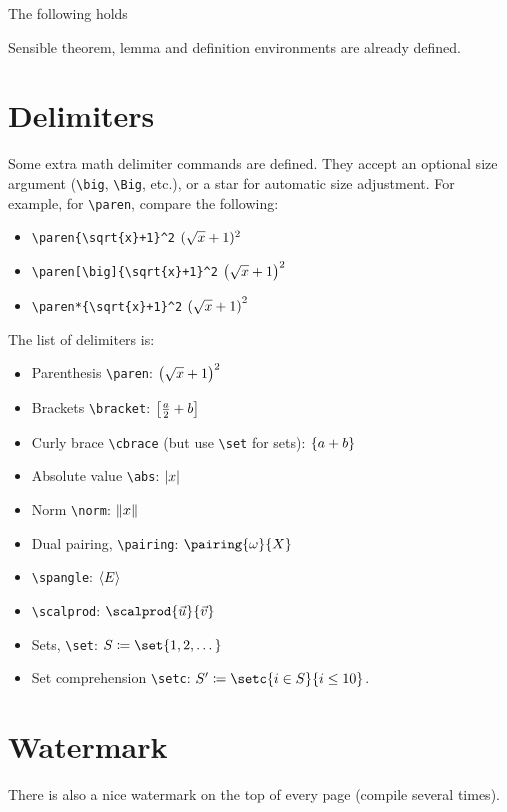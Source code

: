 \documentclass{scrartcl}
\begin{document}
The following holds
\begin{theorem}
Sensible theorem, lemma and definition environments are already defined.
\end{theorem}

\section{Delimiters}

Some extra math delimiter commands are defined.
They accept an optional size argument (\verb|\big|, \verb|\Big|, etc.), or a star for automatic size adjustment.
For example, for \verb|\paren|, compare the following:
\begin{itemize}
\item \verb|\paren{\sqrt{x}+1}^2| \(\paren{\sqrt{x}+1}^2\)
\item \verb|\paren[\big]{\sqrt{x}+1}^2| \(\paren[\big]{\sqrt{x}+1}^2\)
\item \verb|\paren*{\sqrt{x}+1}^2| \(\paren*{\sqrt{x}+1}^2\)
\end{itemize}

The list of delimiters is:

\begin{itemize}
\item Parenthesis \verb|\paren|: \(\paren[\big]{\sqrt{x} + 1}^2\)
  \item Brackets \verb|\bracket|: \(\bracket[\big]{\frac{a}{2}+b}\)
\item Curly brace \verb|\cbrace| (but use \verb|\set| for sets): \(\cbrace{a+b}\)
\item Absolute value \verb|\abs|: \(\abs{x}\)
\item Norm \verb|\norm|: \(\norm{x}\)
\item Dual pairing, \verb|\pairing|: \(\pairing{\omega}{X}\)
  \item \verb|\spangle|: \(\spangle{E}\)
\item \verb|\scalprod|: \(\scalprod{\vec{u}}{\vec{v}}\)
\item Sets, \verb|\set|: \(S \coloneqq \set{1,2,\dotsc}\)
  \item Set comprehension \verb|\setc|: \(S' \coloneqq \setc{i \in S}{i \leq 10}\).
\end{itemize}

\section{Watermark}

There is also a nice watermark on the top of every page (compile several times).
\end{document}
